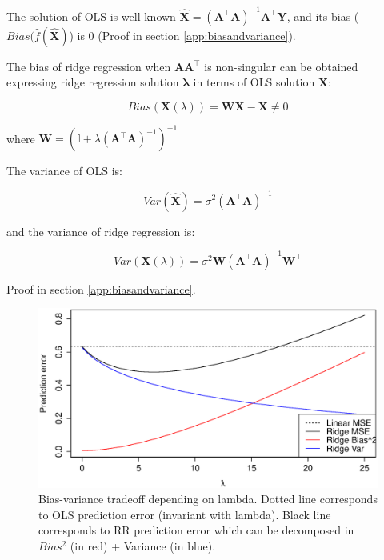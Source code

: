 The solution of OLS is well known $\hat{\mathbf{X}}=(\mathbf{A}^\top \mathbf{A})^{-1}\mathbf{A}^\top \mathbf{Y}$, and its bias ($Bias(\hat{f}(\hat{\mathbf{X}})$)  is 0 (Proof in section \ref{app:biasandvariance}).

The bias of ridge regression when $\mathbf{A A^\top}$ is non-singular
can be obtained expressing ridge regression solution
$\mathbf{\lambda}$ in terms of OLS solution $\hat{\mathbf{X}}$:

\begin{equation}
 Bias(\mathbf{X}(\lambda))  = \mathbf{W} \mathbf{X} - \mathbf{X} \neq 0 
 \end{equation}
 
 \noindent where $\mathbf{W}  = (\mathbb{I} + \lambda (\mathbf{A}^\top
\mathbf{A})^{-1})^{-1}  $


The variance of OLS is:

\begin{equation*}
Var(\hat{\mathbf{X}}) = \sigma^2 (\mathbf{A}^\top \mathbf{A} )^{-1}
\end{equation*}

\noindent and the variance of ridge regression is:

\begin{equation*}
Var(\mathbf{X}(\lambda)) = \sigma^2 \mathbf{W}(\mathbf{A}^\top \mathbf{A} )^{-1}\mathbf{W}^\top
\end{equation*}

Proof in section \ref{app:biasandvariance}.

\begin{figure}[h!]
\includegraphics[width=\linewidth]{img/biasvariance}
\caption[Bias-variance tradeoff depending on lambda]{Bias-variance tradeoff depending on lambda. Dotted line corresponds to OLS prediction error (invariant with lambda). Black line corresponds to RR prediction error which can be decomposed in $Bias^2$ (in red) + Variance (in blue).}
\label{fig:biasvariance}
\end{figure}	


